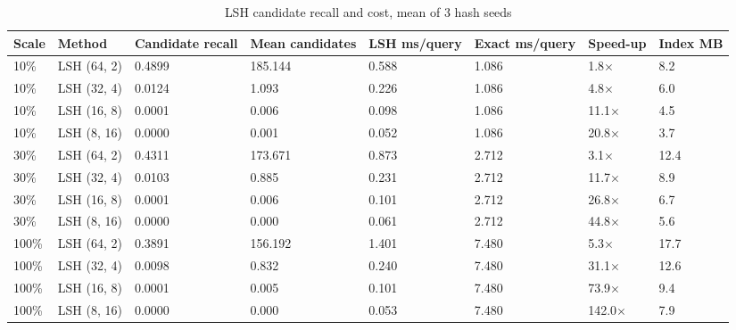 \begin{table}[ht]\centering
\caption{LSH candidate recall and cost, mean of 3 hash seeds}
\begin{tabular}{llllllll}
\hline
Scale & Method & Candidate recall & Mean candidates & LSH ms/query & Exact ms/query & Speed-up & Index MB \\
\hline
10\% & LSH (64, 2) & 0.4899 & 185.144 & 0.588 & 1.086 & 1.8$\times$ & 8.2 \\
10\% & LSH (32, 4) & 0.0124 & 1.093 & 0.226 & 1.086 & 4.8$\times$ & 6.0 \\
10\% & LSH (16, 8) & 0.0001 & 0.006 & 0.098 & 1.086 & 11.1$\times$ & 4.5 \\
10\% & LSH (8, 16) & 0.0000 & 0.001 & 0.052 & 1.086 & 20.8$\times$ & 3.7 \\
30\% & LSH (64, 2) & 0.4311 & 173.671 & 0.873 & 2.712 & 3.1$\times$ & 12.4 \\
30\% & LSH (32, 4) & 0.0103 & 0.885 & 0.231 & 2.712 & 11.7$\times$ & 8.9 \\
30\% & LSH (16, 8) & 0.0001 & 0.006 & 0.101 & 2.712 & 26.8$\times$ & 6.7 \\
30\% & LSH (8, 16) & 0.0000 & 0.000 & 0.061 & 2.712 & 44.8$\times$ & 5.6 \\
100\% & LSH (64, 2) & 0.3891 & 156.192 & 1.401 & 7.480 & 5.3$\times$ & 17.7 \\
100\% & LSH (32, 4) & 0.0098 & 0.832 & 0.240 & 7.480 & 31.1$\times$ & 12.6 \\
100\% & LSH (16, 8) & 0.0001 & 0.005 & 0.101 & 7.480 & 73.9$\times$ & 9.4 \\
100\% & LSH (8, 16) & 0.0000 & 0.000 & 0.053 & 7.480 & 142.0$\times$ & 7.9 \\
\hline
\end{tabular}
\end{table}
